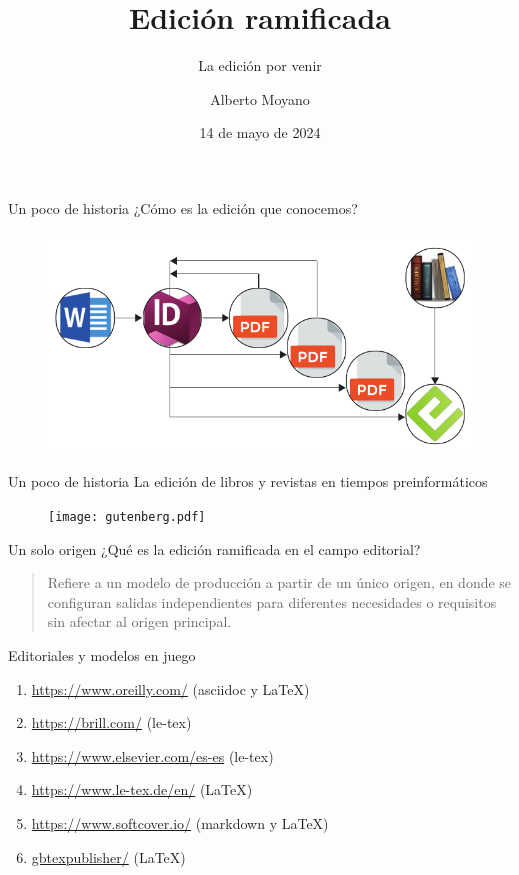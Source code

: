 \documentclass[14pt,aspectratio=169]{beamer}
\title{Edición ramificada}
\subtitle{La edición por venir}
\author{Alberto Moyano}
\date{14 de mayo de 2024}
\institute{\url{https://gitlab.com/alberto.alejandro.moyano/CHARLAMATE}}
\begin{document}
	\begin{frame}
		\titlepage
	\end{frame}

\begin{frame}{Un poco de historia}
	¿Cómo es la edición que conocemos?

	\begin{figure}
	\centering
	\includegraphics[width=.7\textwidth]{ciclos.pdf}
\end{figure}
\end{frame}

\begin{frame}{Un poco de historia}
	La edición de libros y revistas en tiempos preinformáticos
	\begin{figure}
		\centering
		\texttt{[image: gutenberg.pdf]}
	\end{figure}
\end{frame}

\begin{frame}{Un solo origen}
	¿Qué es la edición ramificada en el campo editorial?\vspace{14pt}

	\begin{quote}
	Refiere a un modelo de producción a partir de un único origen, en donde se configuran salidas independientes para diferentes necesidades o requisitos sin afectar al origen principal.
	\end{quote}
\end{frame}

\begin{frame}{Editoriales y modelos en juego}
	\begin{enumerate}
		\item \url{https://www.oreilly.com/} (asciidoc y LaTeX)
		\item \url{https://brill.com/} (le-tex)
		\item \url{https://www.elsevier.com/es-es} (le-tex)
		\item \url{https://www.le-tex.de/en/} (LaTeX)
		\item \url{https://www.softcover.io/} (markdown y LaTeX)
		\item \url{gbtexpublisher/} (LaTeX)
	\end{enumerate}
\end{frame}
\end{document}
